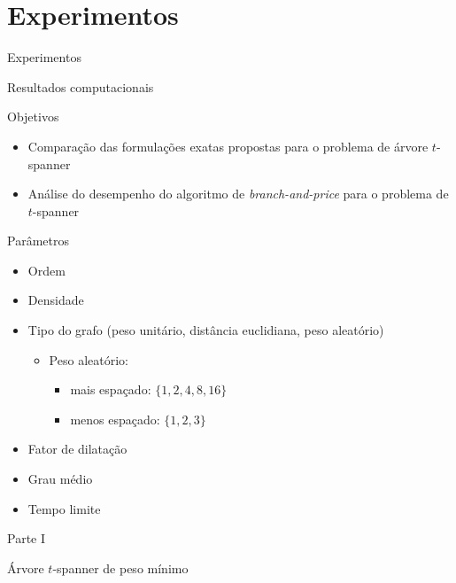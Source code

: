 \documentclass[dvipsnames]{beamer}
\begin{document}
  \section{Experimentos}

  \begin{frame}{Experimentos}
    \begin{center}
      Resultados computacionais
      \end{center}
    \end{frame}

\begin{frame}{Objetivos}
  \begin{itemize}
  \item Comparação das formulações exatas propostas para o problema de árvore $t$-spanner
  \item <2->Análise do desempenho do algoritmo de \emph{branch-and-price} para o
    problema de $t$-spanner
    \end{itemize}
\end{frame}

\begin{frame}{Parâmetros}
  \begin{itemize}
  \item Ordem
  \item <2->Densidade
  \item <3->Tipo do grafo (peso unitário, distância euclidiana, peso aleatório)
    \begin{itemize}
    \item <4->Peso aleatório:
      \begin{itemize}
      \item <4->mais espaçado: $\{1, 2, 4, 8, 16\}$
      \item <5->menos espaçado: $\{1, 2, 3\}$
      \end{itemize}
    \end{itemize}
  \item <6->Fator de dilatação
  \item <7->Grau médio
    \item <8->Tempo limite
  \end{itemize}
\end{frame}


\begin{frame}{Parte I}
  \begin{center}
    Árvore $t$-spanner de peso mínimo
  \end{center}
\end{frame}
\end{document}
